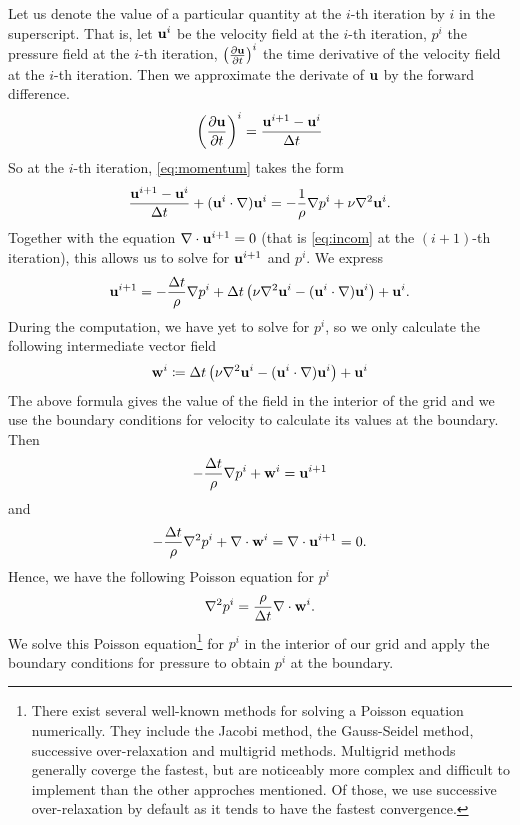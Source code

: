 \documentclass{article}
\newcommand{\vxlisp}{\vspace*{12pt}}
\begin{document}
Let us denote the value of a particular quantity at the $i$-th iteration by $i$ in the superscript. That is, let $\mathbf u^i$ be the velocity field at the $i$-th iteration, $p^i$ the pressure field at the $i$-th iteration, $\left(\frac{\partial \mathbf u}{\partial t}\right)^i$ the time derivative of the velocity field at the $i$-th iteration. Then we approximate the derivate of $\mathbf u$ by the forward difference.
\begin{align}
	\left(\frac{\partial \mathbf u}{\partial t}\right)^i=\frac{\mathbf u^{i+1}-\mathbf u^i}{\Delta t}
\end{align}
So at the $i$-th iteration, \eqref{eq:momentum} takes the form
\begin{align}
	\frac{\mathbf u^{i+1}-\mathbf u^i}{\Delta t}+(\mathbf u^i\cdot\nabla)\mathbf u^i=-\frac1\rho\nabla p^i+\nu\nabla^2\mathbf u^i.
\end{align}
Together with the equation $\nabla\cdot\mathbf u^{i+1}=0$ (that is \eqref{eq:incom} at the $(i+1)$-th iteration), this allows us to solve for $\mathbf u^{i+1}$ and $p^i$. We express
\begin{align}
	\mathbf u^{i+1}=-\frac{\Delta t}\rho\nabla p^i+\Delta t\left(\nu\nabla^2\mathbf u^i-(\mathbf u^i\cdot\nabla)\mathbf u^i\right)+\mathbf u^i.
\end{align}
During the computation, we have yet to solve for $p^i$, so we only calculate the following intermediate vector field
\newcommand{\ww}{\mathbf w}
\begin{align*}
	\ww^i\coloneqq\dt\left(\nu\nabla^2\uu^i-(\uu^i\cdot\nabla)\uu^i\right)+\uu^i
\end{align*}
The above formula gives the value of the field in the interior of the grid and we use the boundary conditions for velocity to calculate its values at the boundary. Then
\begin{align*}
	-\frac\dt\rho\nabla p^i+\ww^i=\uu^{i+1}
\end{align*}
and
\begin{align*}
	-\frac\dt\rho\nabla^2p^i+\nabla\cdot\ww^i=\nabla\cdot\uu^{i+1}=0.
\end{align*}
Hence, we have the following Poisson equation for $p^i$
\begin{align*}
	\nabla^2p^i=\frac\rho\dt\nabla\cdot\ww^i.
\end{align*}
We solve this Poisson equation\footnote{There exist several well-known methods for solving a Poisson equation numerically. They include the Jacobi method, the Gauss-Seidel method, successive over-relaxation and multigrid methods. Multigrid methods generally coverge the fastest, but are noticeably more complex and difficult to implement than the other approches mentioned. Of those, we use successive over-relaxation by default as it tends to have the fastest convergence.} for $p^i$ in the interior of our grid and apply the boundary conditions for pressure to obtain $p^i$ at the boundary.
\vxlisp
\end{document}
